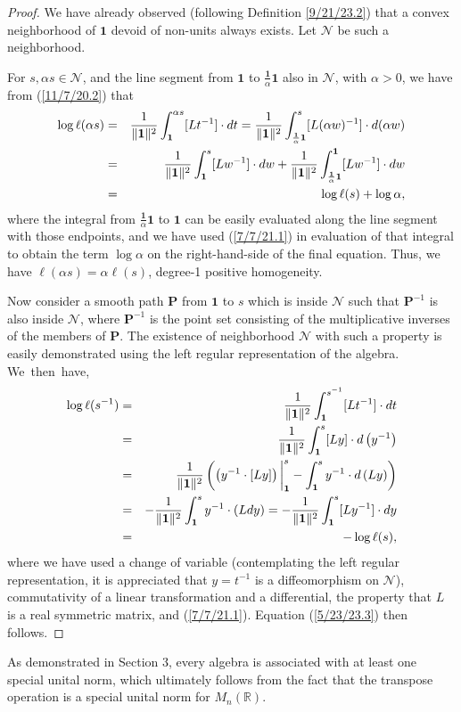 \documentclass{amsart}
\numberwithin{equation}{section}
\theoremstyle{definition}
\numberwithin{theorem}{section}
\begin{document}
\begin{proof} We have already observed (following Definition \ref{9/21/23.2}) that a convex neighborhood of $\mathbf{1}$ devoid of non-units always exists.  Let $\mathcal{N}$  be such a neighborhood.

For $s,\alpha s\in\mathcal{N}$,  and the line segment from $\mathbf{1}$ to $\frac{\mathbf{1}}{\alpha}\mathbf{1}$ also in  $\mathcal{N}$, with $\alpha>0$, we have from (\ref{11/7/20.2}) that
\begin{eqnarray}\nonumber  \log\ell(\alpha s) &=&  \frac{1}{\|{\bf 1}\|^2}\int_{\bf 1}^{\alpha s} [Lt^{-1}]\cdot dt = \frac{1}{\|{\bf 1}\|^2}\int_{\frac{\mathbf{1}}{\alpha}\mathbf{1}}^{s} [L(\alpha w)^{-1}]\cdot d(\alpha w)  \\ \nonumber &=&  \frac{1}{\|{\bf 1}\|^2}\int_{\mathbf{1}}^{s} [Lw^{-1}]\cdot dw + \frac{1}{\|{\bf 1}\|^2}\int_{\frac{\mathbf{1}}{\alpha} \mathbf{1}}^{\mathbf{1}} [Lw^{-1}]\cdot dw  \\ &=& \log \ell(s) + \log\alpha, \label{4/2/23.1}
\end{eqnarray} where the integral from $\frac{\mathbf{1}}{\alpha} \mathbf{1}$ to $\mathbf{1}$ can be easily evaluated along the line segment with those endpoints, and we have used (\ref{7/7/21.1}) in evaluation of that integral to obtain the term $\log \alpha$ on the right-hand-side of the final equation.  Thus, we have $\ell(\alpha s) = \alpha\ell(s)$, degree-1 positive homogeneity.

Now consider a smooth path $\mathbf{P}$ from $\mathbf{1}$ to $s$ which is inside $\mathcal{N}$  such that $\mathbf{P}^{-1}$ is also inside $\mathcal{N}$,  where $\mathbf{P}^{-1}$ is the point set consisting of the multiplicative inverses of the members of $\mathbf{P}$.  The existence of neighborhood $\mathcal{N}$ with such a property is easily demonstrated using the left regular representation of the algebra.
\mbox{We then have,} \begin{eqnarray}  \log \ell(s^{-1})   &=&   \frac{1}{\|{\bf 1}\|^2} \int_{\bf 1}^{s^{-1}} [Lt^{-1}] \cdot dt \nonumber \\ &=&  \frac{1}{\|{\bf 1}\|^2} \int_{\bf 1}^s [Ly]\cdot d\left(y^{-1}\right) \nonumber \\ &=&  \frac{1}{\|{\bf 1}\|^2}\left(\left(y^{-1}\cdot [Ly]\right)\bigg|_{\bf 1}^s - \int_{\bf 1}^s y^{-1}\cdot d\left(Ly\right)\right)   \nonumber \\ &=& -\frac{1}{\|{\bf 1}\|^2} \int_{\bf 1}^s y^{-1}\cdot (Ldy) = -\frac{1}{\|{\bf 1}\|^2} \int_{\bf 1}^s [Ly^{-1}] \cdot dy  \nonumber \\ &=& -\log \ell(s),\label{4/2/23.5} \end{eqnarray} where we have used a change of variable (contemplating the left regular representation, it is appreciated that $y=t^{-1}$ is a diffeomorphism on $\mathcal{N}$), commutativity of a linear transformation and a differential, the property that $L$ is a real symmetric matrix, and  (\ref{7/7/21.1}).  Equation (\ref{5/23/23.3}) then follows.
\end{proof}
As demonstrated in Section 3, every algebra is associated with at least one special unital norm, which ultimately follows from the fact that the transpose operation is a special unital norm for $M_n(\mathbb{R})$.
\end{document}
